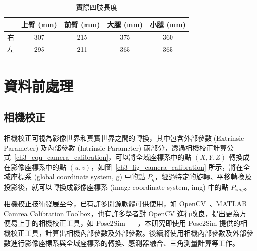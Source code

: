 \begin{table}[!ht]
   \caption[實際四肢長度]{實際四肢長度}
   \centering
   \label{ch3_limb_length}
   \setlength{\tabcolsep}{3pt}
   \renewcommand\arraystretch{1.5}
   \begin{tabular}{c|c|c|c|c}
       & 上臂 (mm) & 前臂 (mm) & 大腿 (mm) & 小腿 (mm) \\ 
      \midrule[2pt]
      右 & 307 & 215 & 375 & 360 \\
      左 & 295 & 211 & 365 & 365 \\
   \end{tabular}
\end{table}

\section{資料前處理}

\subsection{相機校正}
相機校正可視為影像世界和真實世界之間的轉換，其中包含外部參數 (Extrinsic Parameter) 及內部參數 (Intrinsic Parameter) 兩部分，透過相機校正計算公式~\ref{ch3_equ_camera_calibration}，可以將全域座標系中的點 $(X, Y, Z)$ 轉換成在影像座標系中的點 $(u, v)$，如圖~\ref{ch3_fig_camera_calibration} 所示，將在全域座標系 (global coordinate system, g) 中的點 $P_g$，經過特定的旋轉、平移轉換及投影後，就可以轉換成影像座標系 (image coordinate system, img) 中的點 $P_{img}$。

相機校正技術發展至今，已有許多開源軟體可供使用，如 OpenCV~\cite{opencv_library}、MATLAB Camrea Calibration Toolbox，也有許多學者對 OpenCV 進行改良，提出更為方便易上手的相機校正工具，如 Pose2Sim ~\cite{Pagnon_2022_JOSS}~\cite{Pagnon_2021_Robustness}~\cite{Pagnon_2022_Accuracy}，本研究即使用 Pose2Sim 提供的相機校正工具，計算出相機內部參數及外部參數。後續將使用相機內部參數及外部參數進行影像座標系與全域座標系的轉換、感測器融合、三角測量計算等工作。

